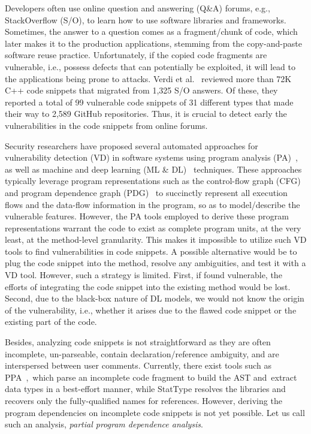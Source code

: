 Developers often use online question and answering (Q\&A) forums, e.g., StackOverflow (S/O), to learn how to use software libraries and frameworks. Sometimes, the answer to a question comes as a fragment/chunk of code, which later makes it to the production applications, stemming from the copy-and-paste software reuse practice. Unfortunately, if the copied code fragments are vulnerable, i.e., possess defects that can potentially be exploited, it will lead to the applications being prone to attacks. Verdi et al.~\cite{verdi-tse22} reviewed more than 72K C++ code snippets that migrated from 1,325 S/O answers. Of these, they reported a total of 99 vulnerable code snippets of 31 different types that made their way to 2,589 GitHub repositories. Thus, it is crucial to detect early the vulnerabilities in the code snippets from online forums.

Security researchers have proposed several automated approaches for vulnerability detection (VD) in software systems using program analysis (PA)~\cite{FlawFinder,RATS,viega2000its4,Checkmarx,HPFortify,Coverity,BufferOverFlow,SQLInj,Cross-siteScripting,AuthBypassSpoofing}, as well as machine and deep learning (ML \& DL)~\cite{fse21,chakraborty2020deep,zhou2019devign,li2018sysevr,li2018vuldeepecker} techniques. These approaches typically leverage program representations such as the control-flow graph (CFG)~\cite{fse21} and program dependence graph (PDG)~\cite{fse21} to succinctly represent all execution flows and the data-flow information in the program, so as to model/describe the vulnerable features. However, the PA tools employed to derive these program representations warrant the code to exist as complete program units, at the very least, at the method-level granularity. This makes it impossible to utilize such VD tools to find vulnerabilities in code snippets. A possible alternative would be to plug the code snippet into the method, resolve any ambiguities, and test it with a VD tool. However, such a strategy is limited. First, if found vulnerable, the efforts of integrating the code snippet into the existing method would be lost. Second, due to the black-box nature of DL models, we would not know the origin of the vulnerability, i.e., whether it arises due to the flawed code snippet or the existing part of the code.

Besides, analyzing code snippets is not straightforward as they are often incomplete, un-parseable, contain declaration/reference ambiguity, and are interspersed between user comments. Currently, there exist tools such as PPA~\cite{ppa08},~which parse an incomplete code fragment to build the AST and~ex\-tract data types in a best-effort manner, while StatType \cite{icse18} resolves the libraries and recovers only the fully-qualified names for references. However, deriving the program dependencies on incomplete code snippets is not yet possible. Let us call such an analysis, {\em partial program dependence analysis}.

